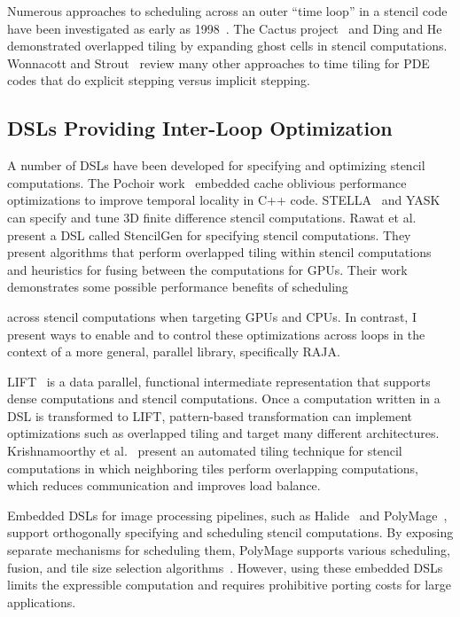 Numerous approaches to scheduling across an outer ``time loop'' in a stencil
code have been investigated as early as 1998~\cite{Bassetti98,Wonnacott00}.  
The Cactus project~\cite{Ripeanu2001,Allen00cactus-gtoolkit} and 
Ding and He~\cite{Ding2001} demonstrated  overlapped tiling by expanding
ghost cells in stencil computations. 
Wonnacott and Strout~\cite{Wonnacott13} review many other approaches to
time tiling for PDE codes that do explicit stepping versus implicit stepping.

\subsection{DSLs Providing Inter-Loop Optimization}
A number of DSLs have been developed for specifying and
optimizing stencil computations.
The Pochoir work~\cite{Tang2011} embedded cache oblivious performance
optimizations to improve temporal locality in C++ code.
STELLA~\cite{Gysi2015}  and YASK~\cite{YASK2016} can specify and 
tune 3D finite difference stencil computations.
Rawat et al.~\cite{Rawat18} present a DSL called StencilGen for specifying
stencil computations.
They present algorithms that perform overlapped tiling within stencil
computations and heuristics for fusing between the computations for GPUs.
Their work demonstrates some possible performance benefits of scheduling

across stencil computations when targeting GPUs and CPUs. In contrast,
I present ways to enable and to control these optimizations across loops
in the context of a more general, parallel library, specifically RAJA\@.

LIFT~\cite{Hagedorn2018} is a data parallel, functional intermediate
representation that supports dense computations and stencil computations.
Once a computation written in a DSL is transformed to LIFT, pattern-based
transformation can implement optimizations such as overlapped tiling and
target many different architectures.
Krishnamoorthy et al.~\cite{krishnamoorthy2007effective} present an automated tiling
technique for stencil computations in which neighboring tiles perform
overlapping computations, which reduces communication and improves load
balance.

Embedded DSLs for image processing pipelines, such as
Halide~\cite{ragan-kelley2013halide} and
PolyMage~\cite{mullapudi2015polymage}, support orthogonally specifying and
scheduling stencil computations.
By exposing separate mechanisms for scheduling them, PolyMage supports
various scheduling, fusion, and tile size selection
algorithms~\cite{Mullapudi2016,Jangda2018,Adams2019}.
However, using these embedded DSLs limits the expressible computation and requires prohibitive porting costs for large applications.

